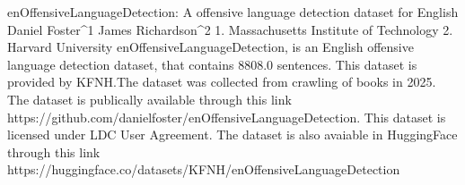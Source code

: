 
enOffensiveLanguageDetection: A offensive language detection dataset for English
Daniel Foster^1 James Richardson^2
1. Massachusetts Institute of Technology 2. Harvard University
enOffensiveLanguageDetection, is an English offensive language detection dataset, that contains 8808.0 sentences.
This dataset is provided by KFNH.The dataset was collected from crawling of books in 2025. 
The dataset is publically available through this link https://github.com/danielfoster/enOffensiveLanguageDetection. This dataset is licensed under LDC User Agreement.
The dataset is also avaiable in HuggingFace through this link https://huggingface.co/datasets/KFNH/enOffensiveLanguageDetection
